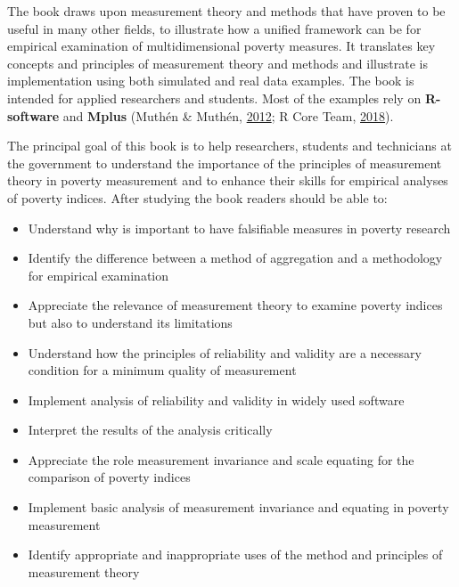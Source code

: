 \documentclass[]{book}
\providecommand{\tightlist}{%
  \setlength{\itemsep}{0pt}\setlength{\parskip}{0pt}}
\begin{document}
The book draws upon measurement theory and methods that have proven to be useful in many other fields, to illustrate how a unified framework can be for empirical examination of multidimensional poverty measures. It translates key concepts and principles of measurement theory and methods and illustrate is implementation using both simulated and real data examples. The book is intended for applied researchers and students. Most of the examples rely on \textbf{R-software} and \textbf{Mplus} (Muthén \& Muthén, \protect\hyperlink{ref-Muthen2012}{2012}; R Core Team, \protect\hyperlink{ref-RCT2018}{2018}).

The principal goal of this book is to help researchers, students and technicians at the government to understand the importance of the principles of measurement theory in poverty measurement and to enhance their skills for empirical analyses of poverty indices. After studying the book readers should be able to:

\begin{itemize}
\tightlist
\item
  Understand why is important to have falsifiable measures in poverty research
\item
  Identify the difference between a method of aggregation and a methodology for empirical examination
\item
  Appreciate the relevance of measurement theory to examine poverty indices but also to understand its limitations
\item
  Understand how the principles of reliability and validity are a necessary condition for a minimum quality of measurement
\item
  Implement analysis of reliability and validity in widely used software
\item
  Interpret the results of the analysis critically
\item
  Appreciate the role measurement invariance and scale equating for the comparison of poverty indices
\item
  Implement basic analysis of measurement invariance and equating in poverty measurement
\item
  Identify appropriate and inappropriate uses of the method and principles of measurement theory
\end{itemize}
\end{document}
